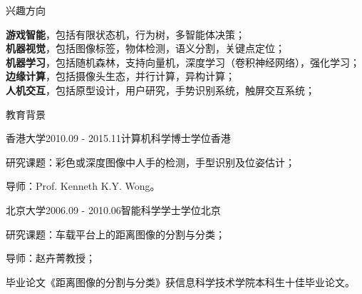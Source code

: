 \documentclass[UTF8]{cv_professional-cn} %
\begin{document}

\begin{rSection}{兴趣方向}

{\bf 游戏智能}，包括有限状态机，行为树，多智能体决策；\\
{\bf 机器视觉}，包括图像标签，物体检测，语义分割，关键点定位；\\
{\bf 机器学习}，包括随机森林，支持向量机，深度学习（卷积神经网络），强化学习； \\
{\bf 边缘计算}，包括摄像头生态，并行计算，异构计算；\\
{\bf 人机交互}，包括原型设计，用户研究，手势识别系统，触屏交互系统； 

\end{rSection}


\begin{rSection}{教育背景}

\begin{rSubsection}{香港大学}{2010.09 - 2015.11}{计算机科学博士学位}{香港}
	\item 研究课题：彩色或深度图像中人手的检测，手型识别及位姿估计；
	\item 导师：Prof. Kenneth K.Y. Wong。
\end{rSubsection}

\begin{rSubsection}{北京大学}{2006.09 - 2010.06}{智能科学学士学位}{北京}
	\item 研究课题：车载平台上的距离图像的分割与分类；
	\item 导师：赵卉菁教授；
	\item 毕业论文《距离图像的分割与分类》获信息科学技术学院本科生十佳毕业论文。
\end{rSubsection}
\end{rSection}

\end{document}
